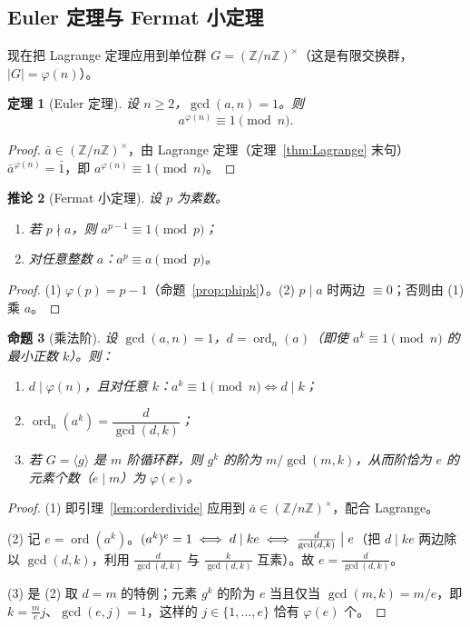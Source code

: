 \documentclass[a4paper,11pt]{ctexart}
\numberwithin{equation}{section}
\theoremstyle{plain}
\newtheorem{theorem}{定理}[section]
\newtheorem{proposition}[theorem]{命题}
\newtheorem{corollary}[theorem]{推论}
\theoremstyle{definition}
\theoremstyle{remark}
\newcommand{\Z}{\mathbb{Z}}
\DeclareMathOperator{\ord}{ord}
\begin{document}
\subsection{Euler 定理与 Fermat 小定理}

现在把 Lagrange 定理应用到单位群 $G=(\Z/n\Z)^{\times}$（这是有限交换群，$|G|=\varphi(n)$）。

\begin{theorem}[Euler 定理]\label{thm:Euler}
设 $n\ge2$，$\gcd(a,n)=1$。则
\[
a^{\varphi(n)}\equiv 1 \pmod n .
\]
\end{theorem}

\begin{proof}
$\bar a\in(\Z/n\Z)^{\times}$，由 Lagrange 定理（定理~\ref{thm:Lagrange} 末句）$\bar a^{\varphi(n)}=\bar 1$，即 $a^{\varphi(n)}\equiv1\pmod n$。
\end{proof}

\begin{corollary}[Fermat 小定理]\label{cor:Fermat}
设 $p$ 为素数。
\begin{enumerate}[itemsep=0.1em]
  \item 若 $p\nmid a$，则 $a^{p-1}\equiv1\pmod p$；
  \item 对任意整数 $a$：$a^{p}\equiv a \pmod p$。
\end{enumerate}
\end{corollary}

\begin{proof}
(1) $\varphi(p)=p-1$（命题~\ref{prop:phipk}）。(2) $p\mid a$ 时两边 $\equiv0$；否则由 (1) 乘 $a$。
\end{proof}

\begin{proposition}[乘法阶]\label{prop:ord}
设 $\gcd(a,n)=1$，$d=\ord_n(a)$（即使 $a^k\equiv1\pmod n$ 的最小正数 $k$）。则：
\begin{enumerate}[itemsep=0.1em]
  \item $d\mid\varphi(n)$，且对任意 $k$：$a^{k}\equiv1\pmod n\iff d\mid k$；
  \item $\ord_n(a^k)=\dfrac{d}{\gcd(d,k)}$；
  \item 若 $G=\langle g\rangle$ 是 $m$ 阶循环群，则 $g^k$ 的阶为 $m/\gcd(m,k)$，从而阶恰为 $e$ 的元素个数（$e\mid m$）为 $\varphi(e)$。
\end{enumerate}
\end{proposition}

\begin{proof}
(1) 即引理~\ref{lem:orderdivide} 应用到 $\bar a\in(\Z/n\Z)^{\times}$，配合 Lagrange。

(2) 记 $e=\ord(a^k)$。$(a^k)^{e}=1\iff d\mid ke\iff \frac{d}{\gcd(d,k)}\bigm| e$（把 $d\mid ke$ 两边除以 $\gcd(d,k)$，利用 $\frac d{\gcd(d,k)}$ 与 $\frac k{\gcd(d,k)}$ 互素）。故 $e=\frac{d}{\gcd(d,k)}$。

(3) 是 (2) 取 $d=m$ 的特例；元素 $g^k$ 的阶为 $e$ 当且仅当 $\gcd(m,k)=m/e$，即 $k=\frac me j$、$\gcd(e,j)=1$，这样的 $j\in\{1,\dots,e\}$ 恰有 $\varphi(e)$ 个。
\end{proof}
\end{document}
